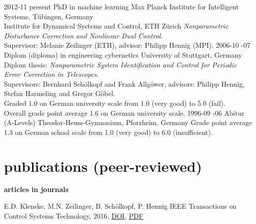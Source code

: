 \documentclass[a4paper]{k-cv} %
\begin{document}
\begin{entrylist}
\entry
{2012-11 \to present}
{PhD {\normalfont in machine learning}}
{Max Planck Institute for Intelligent Systems, T\"ubingen, Germany\\
\phantom{x} \hfill Institute for Dynamical Systems and Control, ETH
Z{\"u}rich}
{\emph{Nonparametric Disturbance Correction and Nonlinear Dual Control}.\\
Supervisor: Melanie Zeilinger (ETH), \mbox{advisor}: Philipp Hennig (MPI).}
\entry
{2006-10 -07}
{Diplom {(diploma) \normalfont in engineering cybernetics}}
{University of Stuttgart, Germany}
{Diplom thesis: \emph{Nonparametric System Identification and Control for
Periodic Error Correction in Telescopes}.\\
Supervisors: Bernhard Sch\"olkopf and Frank Allg\"ower, advisors: Philipp
Hennig, Stefan Harmeling and Gregor G\"obel. \\
Graded 1.0 on German university scale from 1.0 (very
good) to 5.0 (fail).\\
Overall grade point average 1.6 on German university
scale.}
\entry
{1996-09 -06}
{Abitur (A-Levels)}
{Theodor-Heuss-Gymnasium, Pforzheim, Germany}
{Grade point average 1.3 on German school scale from 1.0 (very good) to 6.0
\mbox{(insufficient)}.}
\end{entrylist}


\section{publications (peer-reviewed)}

{\Large \bfseries articles in journals}


{E.D. Klenske, M.N. Zeilinger, B. Sch\"olkopf, P. Hennig}
{IEEE Transactions on Control Systems Technology, 2016.
\href{http://dx.doi.org/10.1109/TCST.2015.2420629}{\to DOI},
\href{https://is.tue.mpg.de/uploads_file/attachment/attachment/9/%
Klenske_tcst__1_.pdf}{\to PDF}
}
\end{document}
